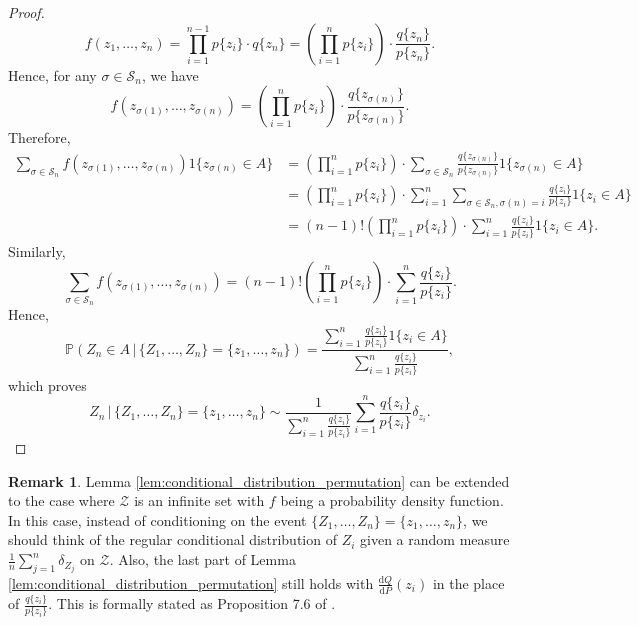 \documentclass[11pt,letterpaper]{article}
\theoremstyle{definition}
\newtheorem{remark}{Remark}
\newcommand{\cS}{\mathcal{S}}
\newcommand{\cZ}{\mathcal{Z}}
\renewcommand{\P}{\mathbb{P}}
\begin{document}
\begin{proof}
    \begin{equation*}
        f(z_1, \ldots, z_n) = \prod_{i = 1}^{n - 1} p\{z_i\} \cdot q\{z_n\} = \left(\prod_{i = 1}^{n} p\{z_i\}\right) \cdot \frac{q\{z_n\}}{p\{z_n\}}.
    \end{equation*}
    Hence, for any $\sigma \in \cS_n$, we have
    \begin{equation*}
        f(z_{\sigma(1)}, \ldots, z_{\sigma(n)}) = \left(\prod_{i = 1}^{n} p\{z_i\}\right) \cdot \frac{q\{z_{\sigma(n)}\}}{p\{z_{\sigma(n)}\}}.
    \end{equation*}
    Therefore, 
    \begin{equation*}
        \begin{split}
            \sum_{\sigma \in \cS_n} f(z_{\sigma(1)}, \ldots, z_{\sigma(n)}) 1\{z_{\sigma(n)} \in A\} 
            & = \left(\prod_{i = 1}^{n} p\{z_i\}\right) \cdot \sum_{\sigma \in \cS_n} \frac{q\{z_{\sigma(n)}\}}{p\{z_{\sigma(n)}\}} 1\{z_{\sigma(n)} \in A\} \\
            & = \left(\prod_{i = 1}^{n} p\{z_i\}\right) \cdot \sum_{i = 1}^{n} \sum_{\sigma \in \cS_n, \sigma(n) = i} \frac{q\{z_i\}}{p\{z_i\}} 1\{z_i \in A\} \\
            & = (n - 1)! \left(\prod_{i = 1}^{n} p\{z_i\}\right) \cdot \sum_{i = 1}^{n} \frac{q\{z_i\}}{p\{z_i\}} 1\{z_i \in A\}.            
        \end{split}
    \end{equation*}
    Similarly, 
    \begin{equation*}
        \sum_{\sigma \in \cS_n} f(z_{\sigma(1)}, \ldots, z_{\sigma(n)}) = (n - 1)! \left(\prod_{i = 1}^{n} p\{z_i\}\right) \cdot \sum_{i = 1}^{n} \frac{q\{z_i\}}{p\{z_i\}}.
    \end{equation*}
    Hence, 
    \begin{equation*}
        \P(Z_n \in A \, | \, \{Z_1, \ldots, Z_n\} = \{z_1, \ldots, z_n\}) = \frac{\sum_{i = 1}^{n} \frac{q\{z_i\}}{p\{z_i\}} 1\{z_i \in A\}}{\sum_{i = 1}^{n} \frac{q\{z_i\}}{p\{z_i\}}},
    \end{equation*}
    which proves
    \begin{equation*}
        Z_n \, | \, \{Z_1, \ldots, Z_n\} = \{z_1, \ldots, z_n\} \sim \frac{1}{\sum_{i = 1}^{n} \frac{q\{z_i\}}{p\{z_i\}}} \sum_{i = 1}^{n} \frac{q\{z_i\}}{p\{z_i\}} \delta_{z_i}.
    \end{equation*}
\end{proof}
\begin{remark}
    Lemma \ref{lem:conditional_distribution_permutation} can be extended to the case where $\cZ$ is an infinite set with $f$ being a probability density function. In this case, instead of conditioning on the event $\{Z_1, \ldots, Z_n\} = \{z_1, \ldots, z_n\}$, we should think of the regular conditional distribution of $Z_i$ given a random measure $\frac{1}{n} \sum_{j = 1}^{n} \delta_{Z_j}$ on $\cZ$. Also, the last part of Lemma \ref{lem:conditional_distribution_permutation} still holds with $\frac{\mathrm{d} Q}{\mathrm{d} P}(z_i)$ in the place of $\frac{q\{z_i\}}{p\{z_i\}}$. This is formally stated as Proposition 7.6 of \cite{angelopoulos2024theoretical}.
\end{remark}
\end{document}
